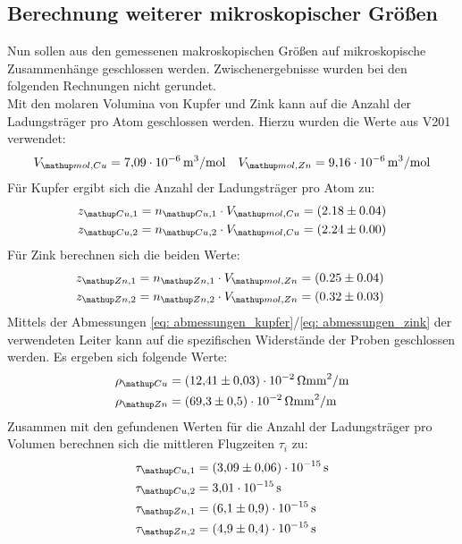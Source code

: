 \subsection{Berechnung weiterer mikroskopischer Größen}
Nun sollen aus den gemessenen makroskopischen Größen auf mikroskopische Zusammenhänge geschlossen werden. Zwischenergebnisse
wurden bei den folgenden Rechnungen nicht gerundet. \\
Mit den molaren Volumina von Kupfer und Zink kann auf die Anzahl der Ladungsträger pro Atom
geschlossen werden. Hierzu wurden die Werte aus V201 \cite{anleitung201} verwendet:
\begin{equation}
  V\ua{mol, Cu} = \SI{7.09e-6}{m^3 /mol} \quad   V\ua{mol, Zn} = \SI{9.16e-6}{m^3 /mol}%
\end{equation}
Für Kupfer ergibt sich die Anzahl der Ladungsträger pro Atom zu:
\begin{align}
  \begin{aligned}
    z\ua{Cu,1} &= n\ua{Cu,1} \cdot V\ua{mol, Cu} =  (2.18 \pm 0.04)  \\
    z\ua{Cu,2} &= n\ua{Cu,2} \cdot V\ua{mol, Cu} =  (2.24 \pm 0.00)
  \end{aligned}
\end{align}
Für Zink berechnen sich die beiden Werte:
\begin{align}
  \begin{aligned}
    z\ua{Zn,1} &= n\ua{Zn,1} \cdot V\ua{mol, Zn} =  (0.25\pm 0.04)\\
    z\ua{Zn,2} &= n\ua{Zn,2} \cdot V\ua{mol, Zn} =   (0.32\pm 0.03)\
  \end{aligned}
\end{align}
Mittels der Abmessungen \eqref{eq: abmessungen_kupfer}/\eqref{eq: abmessungen_zink} der verwendeten Leiter kann auf die spezifischen Widerstände der Proben geschlossen werden. Es ergeben sich folgende Werte:
\begin{align}
  \begin{aligned}
    \rho\ua{Cu} &=  \SI{12.41(3)e-2}{\ohm \milli \meter^2 \per \meter} \\%
    \rho\ua{Zn} &=  \SI{69.3(5)e-2}{\ohm \milli \meter^2 \per \meter}
    \label{eq: res_spez_widerstand}
  \end{aligned}
\end{align}
Zusammen mit den gefundenen Werten für die Anzahl der Ladungsträger pro Volumen berechnen sich die mittleren Flugzeiten $\tau_i$ zu:
\begin{align}
  \begin{aligned}
    \tau\ua{Cu,1} &= \SI{3.09(6)e-15}{\second} \\%
    \tau\ua{Cu,2} &= \SI{3.01(0)e-15}{\second} \\
    \tau\ua{Zn,1} &= \SI{6.1(9)e-15}{\second} \\
    \tau\ua{Zn,2} &= \SI{4.9(4)e-15}{\second}
  \end{aligned}
\end{align}
